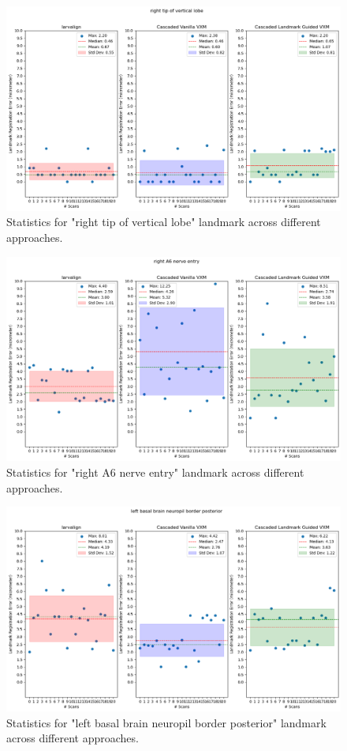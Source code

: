 \documentclass{report}
\begin{document}
\begin{figure}[h!]
	\centering
	\includegraphics[width=0.7\columnwidth]{resources/chapter5_fresh/output/right tip of vertical lobe.png}
	\caption{Statistics for "right tip of vertical lobe" landmark across different approaches.}
	\label{fig:landmark23}
\end{figure}

\begin{figure}[h!]
	\centering
	\includegraphics[width=0.7\columnwidth]{resources/chapter5_fresh/output/right A6 nerve entry.png}
	\caption{Statistics for "right A6 nerve entry" landmark across different approaches.}
	\label{fig:landmark24}
\end{figure}

\begin{figure}[h!]
	\centering
	\includegraphics[width=0.7\columnwidth]{resources/chapter5_fresh/output/left basal brain neuropil border posterior.png}
	\caption{Statistics for "left basal brain neuropil border posterior" landmark across different approaches.}
	\label{fig:landmark25}
\end{figure}
\end{document}
